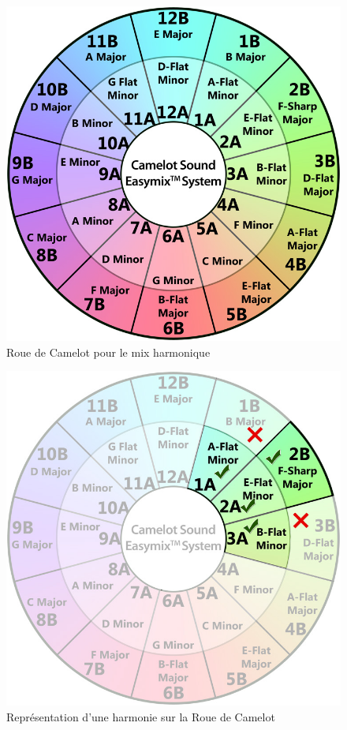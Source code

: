 \documentclass[a4paper,12pt]{article}
\begin{document}
\newpage

\begin{figure}[!h]
  \begin{center}
    \includegraphics[scale=0.5]{camelot-wheel.jpg}
    \caption{Roue de Camelot pour le mix harmonique}
  \end{center}
\end{figure}

\newpage

\begin{figure}[!h]
  \begin{center}
    \includegraphics[scale=0.5]{camelot-wheel-harmony.jpg}
    \caption{Représentation d'une harmonie sur la Roue de Camelot}
  \end{center}
\end{figure}
\end{document}
